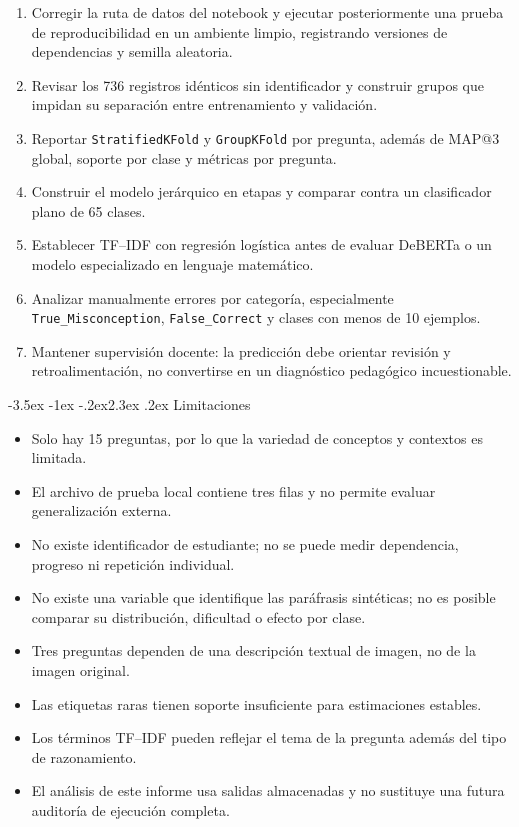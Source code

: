\documentclass[11pt,oneside,openany]{book}
\makeatletter
\renewcommand\section{\@startsection{section}{1}{\z@}%
  {-3.5ex \@plus -1ex \@minus -.2ex}{2.3ex \@plus .2ex}%
  {\normalfont\Large\sffamily\bfseries\color{AzulMedio}}}
\newcommand{\codigo}[1]{\texttt{#1}}
\makeatother
\begin{document}
\begin{enumerate}
  \item Corregir la ruta de datos del notebook y ejecutar posteriormente una
        prueba de reproducibilidad en un ambiente limpio, registrando versiones
        de dependencias y semilla aleatoria.
  \item Revisar los 736 registros idénticos sin identificador y construir grupos
        que impidan su separación entre entrenamiento y validación.
  \item Reportar \codigo{StratifiedKFold} y \codigo{GroupKFold} por pregunta,
        además de MAP@3 global, soporte por clase y métricas por pregunta.
  \item Construir el modelo jerárquico en etapas y comparar contra un
        clasificador plano de 65 clases.
  \item Establecer TF--IDF con regresión logística antes de evaluar DeBERTa o un
        modelo especializado en lenguaje matemático.
  \item Analizar manualmente errores por categoría, especialmente
        \codigo{True\_}\allowbreak\codigo{Misconception},
        \codigo{False\_}\allowbreak\codigo{Correct} y clases con menos
        de 10 ejemplos.
  \item Mantener supervisión docente: la predicción debe orientar revisión y
        retroalimentación, no convertirse en un diagnóstico pedagógico
        incuestionable.
\end{enumerate}

\section{Limitaciones}

\begin{itemize}
  \item Solo hay 15 preguntas, por lo que la variedad de conceptos y contextos
        es limitada.
  \item El archivo de prueba local contiene tres filas y no permite evaluar
        generalización externa.
  \item No existe identificador de estudiante; no se puede medir dependencia,
        progreso ni repetición individual.
  \item No existe una variable que identifique las paráfrasis sintéticas; no es
        posible comparar su distribución, dificultad o efecto por clase.
  \item Tres preguntas dependen de una descripción textual de imagen, no de la
        imagen original.
  \item Las etiquetas raras tienen soporte insuficiente para estimaciones
        estables.
  \item Los términos TF--IDF pueden reflejar el tema de la pregunta además del
        tipo de razonamiento.
  \item El análisis de este informe usa salidas almacenadas y no sustituye una
        futura auditoría de ejecución completa.
\end{itemize}
\end{document}
